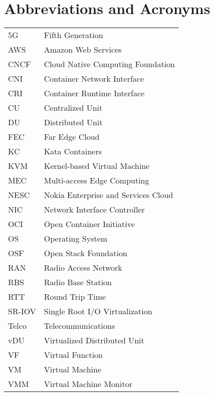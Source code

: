 \chapter*{Abbreviations and Acronyms}

\noindent
\begin{longtable}{@{}p{}p{}@{}}
5G & Fifth Generation \\
AWS & Amazon Web Services \\
CNCF & Cloud Native Computing Foundation \\
CNI & Container Network Interface \\
CRI & Container Runtime Interface \\
CU & Centralized Unit \\
DU & Distributed Unit \\
FEC & Far Edge Cloud \\
KC & Kata Containers \\
KVM & Kernel-based Virtual Machine \\
MEC & Multi-access Edge Computing \\
NESC & Nokia Enterprise and Services Cloud \\
NIC & Network Interface Controller \\
OCI & Open Container Initiative \\
OS & Operating System \\
OSF & Open Stack Foundation \\
RAN & Radio Access Network \\
RBS & Radio Base Station \\
RTT & Round Trip Time \\
SR-IOV & Single Root I/O Virtualization \\
Telco & Telecommunications \\
vDU & Virtualized Distributed Unit \\
VF & Virtual Function \\
VM & Virtual Machine \\
VMM & Virtual Machine Monitor \\



\end{longtable}
